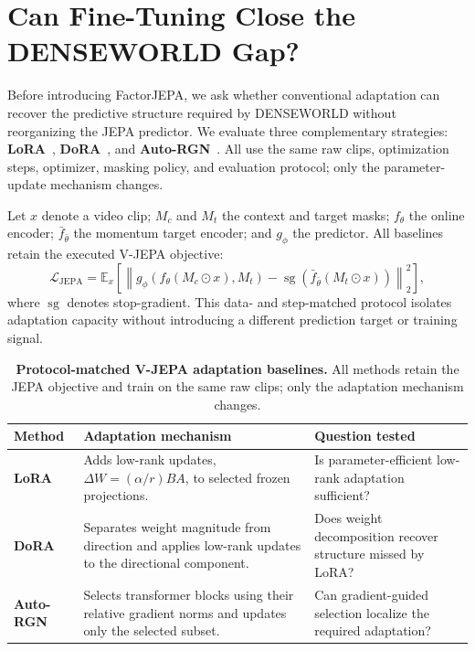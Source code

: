 





\section{Can Fine-Tuning Close the \textbf{DENSEWORLD} Gap?}
\label{sec:vjepa_adaptation_baselines}

Before introducing FactorJEPA, we ask whether conventional adaptation can recover the predictive structure required by DENSEWORLD without reorganizing the JEPA predictor. We evaluate three complementary strategies: \textbf{LoRA}~\cite{hu2022lora}, \textbf{DoRA}~\cite{liu2024dora}, and \textbf{Auto-RGN}~\cite{lee2023surgical}. All use the same raw clips, optimization steps, optimizer, masking policy, and evaluation protocol; only the parameter-update mechanism changes.

Let $x$ denote a video clip; $M_c$ and $M_t$ the context and target masks; $f_\theta$ the online encoder; $\bar f_{\bar\theta}$ the momentum target encoder; and $g_\phi$ the predictor. All baselines retain the executed V-JEPA objective:
\[
\mathcal{L}_{\mathrm{JEPA}}
=
\mathbb{E}_{x}
\left[
\left\|
g_\phi\!\left(f_\theta(M_c\odot x),M_t\right)
-
\operatorname{sg}\!\left(
\bar f_{\bar\theta}(M_t\odot x)
\right)
\right\|_2^2
\right],
\]
where $\operatorname{sg}$ denotes stop-gradient. This data- and step-matched protocol isolates adaptation capacity without introducing a different prediction target or training signal.

\begin{table}[ht!]
\centering
\caption{
\textbf{Protocol-matched V-JEPA adaptation baselines.}
All methods retain the JEPA objective and train on the same raw clips; only the adaptation mechanism changes.
}
\label{tab:vjepa_adaptation_baselines}
\scriptsize
\setlength{\tabcolsep}{3pt}
\renewcommand{\arraystretch}{1.08}
\begin{tabular}{
    p{}
    p{}
    p{}
}
\toprule
\textbf{Method} & \textbf{Adaptation mechanism} & \textbf{Question tested} \\
\midrule

\textbf{LoRA}~\cite{hu2022lora}
&
Adds low-rank updates,
$\Delta W=(\alpha/r)BA$, to selected frozen projections.
&
Is parameter-efficient low-rank adaptation sufficient?
\\
\midrule

\textbf{DoRA}~\cite{liu2024dora}
&
Separates weight magnitude from direction and applies low-rank updates to the directional component.
&
Does weight decomposition recover structure missed by LoRA?
\\
\midrule

\textbf{Auto-RGN}~\cite{lee2023surgical}
&
Selects transformer blocks using their relative gradient norms and updates only the selected subset.
&
Can gradient-guided selection localize the required adaptation?
\\

\bottomrule
\end{tabular}
\end{table}


